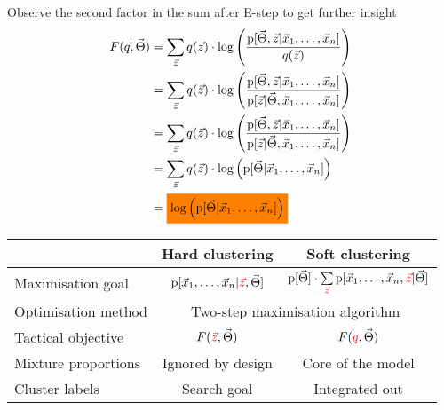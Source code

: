 \documentclass[landscape,footrule]{foils}
\newcommand{\pd}[1]{\mathrm{p}[#1]}
\begin{document}

Observe the second factor in the sum after E-step to get further insight  
\begin{align*}
F(\vec{q},\vec{\Theta})&= \sum_{\vec{z}}q(\vec{z})\cdot\log\left(\frac{\pd{\vec{\Theta},\vec{z}|\vec{x}_1,\ldots,\vec{x}_n}}{q(\vec{z})}\right)\\
&=\sum_{\vec{z}}q(\vec{z})\cdot\log\left(\frac{\pd{\vec{\Theta},\vec{z}|\vec{x}_1,\ldots,\vec{x}_n}}{\pd{\vec{z}|\vec{\Theta},\vec{x}_1,\ldots,\vec{x}_n}}\right)\\
&= \sum_{\vec{z}}q(\vec{z})\cdot\log\left(\frac{\pd{\vec{\Theta},\vec{z}|\vec{x}_1,\ldots,\vec{x}_n}}{\pd{\vec{z}|\vec{\Theta},\vec{x}_1,\ldots,\vec{x}_n}}\right)\\
&= \sum_{\vec{z}}q(\vec{z})\cdot\log\left(\pd{\vec{\Theta}|\vec{x}_1,\ldots,\vec{x}_n}\right)\\
&= \colorbox{orange}{$\log\left(\pd{\vec{\Theta}|\vec{x}_1,\ldots,\vec{x}_n}\right)$}
\end{align*}



\hspace*{-0.3cm}
\begin{tabular}{|l|c|c|}
\hline
& Hard clustering & Soft clustering\\
\hline
Maximisation goal \rule[-0.75cm]{0cm}{2cm}
& $\pd{\vec{x}_1,\ldots,\vec{x}_n|\textcolor{red}{\vec{z}},\vec{\Theta}}$
& \cellcolor{green!25}
$\pd{\vec{\Theta}}\cdot
  \sum\limits_{\textcolor{red}{\vec{z}}}\pd{\vec{x}_1,\ldots,\vec{x}_n,\textcolor{red}{\vec{z}}|\vec{\Theta}}$\\
\hline
Optimisation method \rule[-0.75cm]{0cm}{2cm}\hspace*{-1cm}
& \multicolumn{2}{|c|}{\cellcolor{green!25} Two-step maximisation algorithm}\\
\hline
Tactical objective\rule[-0.75cm]{0cm}{2cm}
& $F(\textcolor{red}{\vec{z}},\vec{\Theta})$
&  \cellcolor{green!25} $F(\textcolor{red}{q},\vec{\Theta})$\\
\hline
Mixture proportions \rule[-0.75cm]{0cm}{2cm}
& Ignored by design
&  \cellcolor{green!25} Core of the model\\
\hline 
Cluster labels \rule[-0.75cm]{0cm}{2cm}
& Search goal
&  \cellcolor{green!25} Integrated out\\
\hline 
\end{tabular}


\end{document}
